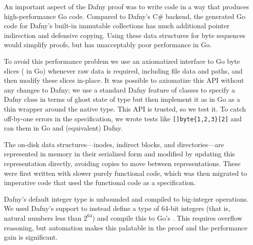 An important aspect of the Dafny proof was to write code in a way that produces
high-performance Go code.
Compared to Dafny's C\# backend, the generated Go code for Dafny's built-in
immutable collections has much
additional pointer indirection and defensive copying. Using these data
structures for byte sequences would simplify proofs, but has unacceptably poor
performance in Go.

To avoid this performance problem we use an axiomatized interface to
Go byte slices ( in Go) whenever raw data is required, including file
data and paths, and then modify these slices in-place. It was possible to
axiomatize this API without any changes to Dafny; we use a standard Dafny
feature of  classes to specify a Dafny class  in terms of
ghost state of type  but then implement it as in Go as a thin
wrapper around the native  type. This API is trusted, so we
test it. To catch off-by-one errors in the specification, we wrote
tests like \verb![]byte{1,2,3}[2]! and ran them in Go and
(equivalent) Dafny.

The on-disk data structures---inodes, indirect
blocks, and directories---are represented in memory in their serialized form and
modified by updating this representation directly, avoiding copies to move
between representations. These were first written with slower purely
functional code, which was then migrated to imperative code that
used the functional code as a specification.


Dafny's default integer type  is unbounded and compiled to big-integer
operations. We used Dafny's
 support to instead define a type of 64-bit integers (that
is, natural numbers less than $2^{64}$) and compile this to Go's .
This requires overflow reasoning, but
automation makes this palatable in the proof and the performance gain is
significant.




